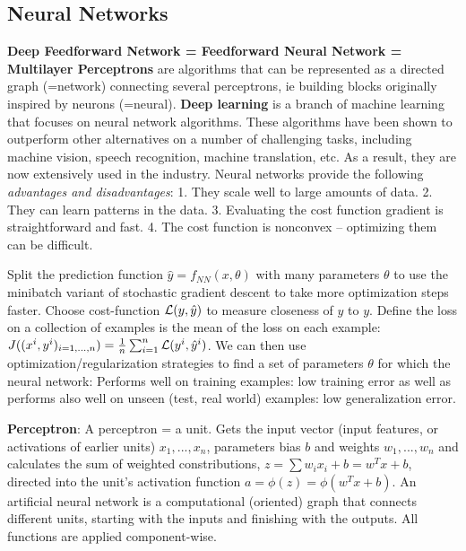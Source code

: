 \subsection*{Neural Networks}
\textbf{Deep Feedforward Network = Feedforward Neural Network = Multilayer Perceptrons} are algorithms that can be represented as a directed graph (=network) connecting several perceptrons, ie building blocks originally inspired by neurons (=neural).
\textbf{Deep learning} is a branch of machine learning that focuses on neural network algorithms.
These algorithms have been shown to outperform other alternatives on a number of challenging tasks, including machine vision, speech recognition, machine translation, etc. As a result, they are now extensively used in the industry.
Neural networks provide the following \textit{advantages and disadvantages}: 1. They scale well to large amounts of data.
2. They can learn patterns in the data.
3. Evaluating the cost function gradient is straightforward and fast.
4. The cost function is nonconvex – optimizing them can be difficult.

Split the prediction function $\hat{y}=f_{NN} (x,\theta)$ with many parameters $\theta$ to use the minibatch variant of stochastic gradient descent to take more optimization steps faster.
Choose cost-function $\mathcal{L}(y,\hat{y})$ to measure closeness of $\hat{y}$ to $y$. 
Define the loss on a collection of examples is the mean of the loss on each example: $J((x^i, y^i)_{i=1,...,n})=\frac{1}{n} \sum_{i=1}^n \mathcal{L}(y^i, \hat{y}^i)$.
We can then use optimization/regularization strategies to find a set of parameters $\theta$ for which the neural network: Performs well on training examples: low training error as well as performs also well on unseen (test, real world) examples: low generalization error.

\textbf{Perceptron}: A perceptron = a unit. Gets the input vector (input features, or activations of earlier units) $x_1,...,x_n$, parameters bias $b$ and weights $w_1,...,w_n$ and calculates the sum of weighted constributions, $z=\sum w_i x_i + b = w^T x + b$, directed into the unit's activation function $a = \phi (z) = \phi (w^T x + b)$.
An artificial neural network is a computational (oriented) graph that connects different units, starting with the inputs and finishing with the outputs.
All functions are applied component-wise.

